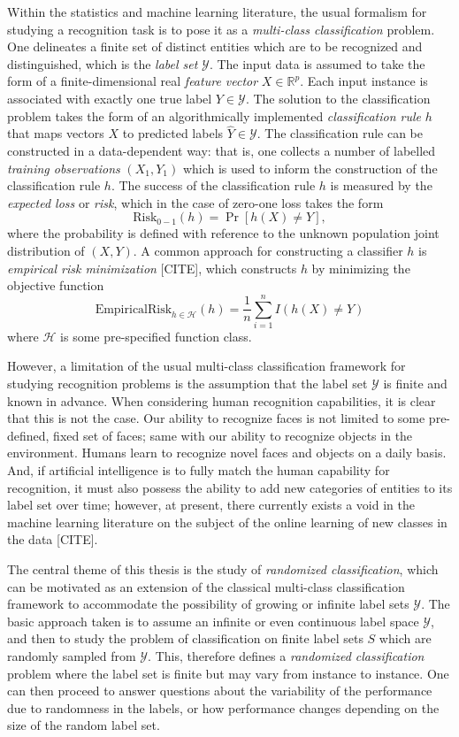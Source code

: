 Within the statistics and machine learning literature, the usual
formalism for studying a recognition task is to pose it as a
\emph{multi-class classification} problem.  One delineates a finite
set of distinct entities which are to be recognized and distinguished,
which is the \emph{label set} $\mathcal{Y}$.  The input data is
assumed to take the form of a finite-dimensional real \emph{feature
  vector} $X \in \mathbb{R}^p$.  Each input instance is associated
with exactly one true label $Y \in \mathcal{Y}$.  The solution to the
classification problem takes the form of an algorithmically
implemented \emph{classification rule} $h$ that maps vectors $X$ to
predicted labels $\hat{Y} \in \mathcal{Y}$.  The classification rule
can be constructed in a data-dependent way: that is, one collects a
number of labelled \emph{training observations} $(X_1, Y_1)$ which is
used to inform the construction of the classification rule $h$.  The
success of the classification rule $h$ is measured by the \emph{expected loss} or \emph{risk},
which in the case of zero-one loss takes the form
\[
\text{Risk}_{0-1}(h) = \Pr[h(X) \neq Y],
\]
where the probability is defined with reference to the unknown
population joint distribution of $(X, Y)$.  A common approach for
constructing a classifier $h$ is \emph{empirical risk minimization} [CITE],
which constructs $h$ by minimizing the objective function
\[
\text{EmpiricalRisk}_{h \in \mathcal{H}}(h) = \frac{1}{n} \sum_{i=1}^n I(h(X) \neq Y)
\]
where $\mathcal{H}$ is some pre-specified function class.

However, a limitation of the usual multi-class classification
framework for studying recognition problems is the assumption that the
label set $\mathcal{Y}$ is finite and known in advance.  When
considering human recognition capabilities, it is clear that this is
not the case.  Our ability to recognize faces is not limited to some
pre-defined, fixed set of faces; same with our ability to recognize
objects in the environment.  Humans learn to recognize novel faces and
objects on a daily basis.  And, if artificial intelligence is to fully
match the human capability for recognition, it must also possess the
ability to add new categories of entities to its label set over time;
however, at present, there currently exists a void in the machine
learning literature on the subject of the online learning of new
classes in the data [CITE].

The central theme of this thesis is the study of \emph{randomized
  classification}, which can be motivated as an extension of the
classical multi-class classification framework to accommodate the
possibility of growing or infinite label sets $\mathcal{Y}$. The basic
approach taken is to assume an infinite or even continuous label space
$\mathcal{Y}$, and then to study the problem of classification on
finite label sets $S$ which are randomly sampled from $\mathcal{Y}.$
This, therefore defines a \emph{randomized classification} problem
where the label set is finite but may vary from instance to instance.
One can then proceed to answer questions about the variability of the
performance due to randomness in the labels, or how performance
changes depending on the size of the random label set.


